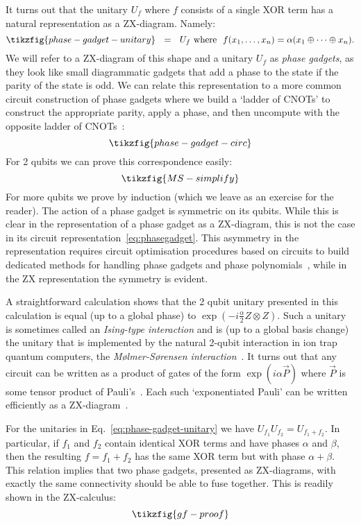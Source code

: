 \documentclass[a4paper,onecolumn,superscriptaddress,11pt,%
				unpublished,%
				allowfontchageintitle,%
				]{quantumarticle}
\begin{document}
It turns out that the unitary $U_f$ where $f$ consists of a single XOR term has a natural representation as a ZX-diagram. Namely:
\begin{equation}\label{eq:phase-gadget-unitary}
  \tikzfig{phase-gadget-unitary} \ \  = \ \ U_f \text{ where }\  f(x_1,\ldots,x_n) = \alpha (x_1\oplus\cdots\oplus x_n).
\end{equation}
We will refer to a ZX-diagram of this shape and a unitary $U_f$ as \emph{phase gadgets}, as they look like small diagrammatic gadgets that add a phase to the state if the parity of the state is odd.
We can relate this representation to a more common circuit construction of phase gadgets where we build a `ladder of CNOTs' to construct the appropriate parity, apply a phase, and then uncompute with the opposite ladder of CNOTs~\cite{phaseGadgetSynth}:
\begin{equation}\label{eq:phasegadget}
\tikzfig{phase-gadget-circ}
\end{equation}
For 2 qubits we can prove this correspondence easily:
\begin{equation}
\tikzfig{MS-simplify}
\end{equation}
For more qubits we prove by induction (which we leave as an exercise for the reader).
The action of a phase gadget is symmetric on its qubits. While this is clear in the representation of a phase gadget as a ZX-diagram, this is not the case in its circuit representation~\eqref{eq:phasegadget}. This asymmetry in the representation requires circuit optimisation procedures based on circuits to build dedicated methods for handling phase gadgets and phase polynomials~\cite{nam2018automated}, while in the ZX representation the symmetry is evident.

A straightforward calculation shows that the 2 qubit unitary presented in this calculation is equal (up to a global phase) to $\exp(-i\frac{\alpha}{2} Z\otimes Z)$. Such a unitary is sometimes called an \emph{Ising-type interaction} and is (up to a global basis change) the unitary that is implemented by the natural 2-qubit interaction in ion trap quantum computers, the \emph{M\o{}lmer-S\o{}rensen interaction}~\cite{molmersorensen1999}. It turns out that any circuit can be written as a product of gates of the form $\exp(i\alpha \vec P)$ where $\vec P$ is some tensor product of Pauli's~\cite{Litinski2019gameofsurfacecodes}. Each such `exponentiated Pauli' can be written efficiently as a ZX-diagram~\cite{phaseGadgetSynth}.

For the unitaries in Eq.~\eqref{eq:phase-gadget-unitary} we have $U_{f_1}U_{f_2} = U_{f_1+f_2}$. In particular, if $f_1$ and $f_2$ contain identical XOR terms and have phases $\alpha$ and $\beta$, then the resulting $f=f_1+f_2$ has the same XOR term but with phase $\alpha+\beta$. This relation implies that two phase gadgets, presented as ZX-diagrams, with exactly the same connectivity should be able to fuse together. This is readily shown in the ZX-calculus:
\begin{equation}\label{eq:phase-gadget-fusion}
	\tikzfig{gf-proof}
\end{equation}
\end{document}
